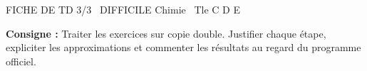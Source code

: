 \documentclass[11pt]{article}
\begin{document}
\begin{tcolorbox}[enhanced,colback=popink,colframe=popink,arc=10pt,boxrule=0pt,left=12pt,right=12pt,top=9pt,bottom=9pt]
{\color{white}\popxbold\small FICHE DE TD 3/3 \textbullet\ DIFFICILE \hfill Chimie \textbullet\ Tle C D E\par}
\end{tcolorbox}
\vspace{4pt}
\noindent \textbf{Consigne :} Traiter les exercices sur copie double. Justifier chaque étape, expliciter les approximations et commenter les résultats au regard du programme officiel.
\end{document}

